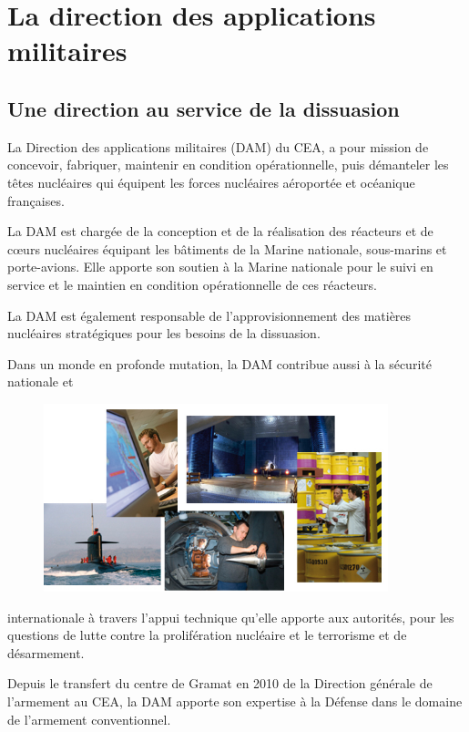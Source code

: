\documentclass[12pt,a4paper,twoside]{article}
\begin{document}
    \newpage

    \section*{La direction des applications militaires}

    \subsection*{Une direction au service de la dissuasion}
    La Direction des applications militaires (DAM) du CEA, a pour mission
    de concevoir, fabriquer, maintenir en condition opérationnelle, puis démanteler
    les têtes nucléaires qui équipent les forces nucléaires aéroportée et océanique
    françaises.

    La DAM est chargée de la conception et de la réalisation des réacteurs et de
    c\oe urs nucléaires équipant les bâtiments de la Marine nationale, sous-marins
    et porte-avions. Elle apporte son soutien à la Marine nationale pour le suivi en
    service et le maintien en condition opérationnelle de ces réacteurs.

    La DAM est également responsable de l'approvisionnement des matières nucléaires
    straté\-giques pour les besoins de la dissuasion.

    Dans un monde en profonde mutation, la DAM contribue aussi à la sécurité
    nationale et
    \begin{figure}
        \includegraphics[width=10cm]{ressources/images/dam/5_thumbnails.jpg}
    \end{figure}
    internationale à travers l'appui technique qu'elle apporte aux autorités, pour
    les questions de lutte contre la prolifération nucléaire et le terrorisme et de
    désarmement.

    Depuis le transfert du centre de Gramat en 2010 de la Direction générale de
    l'armement au CEA, la DAM apporte son expertise à la Défense dans le domaine de
    l'armement conventionnel.
\end{document}
